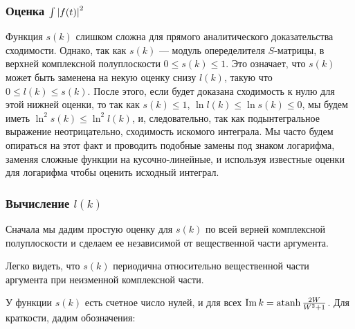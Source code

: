 



\subsubsection{Оценка $\int \abs{f(t)}^2$}
Функция $s(k)$  слишком сложна для прямого аналитического доказательства сходимости. Однако, так как $s(k)$ — модуль опеределителя $S$-матрицы, в верхней комплексной полуплоскости $0 \le s(k) \le 1$. Это означает, что $s(k)$ может быть заменена на некую оценку снизу $l(k)$, такую что $0 \le l(k) \le s(k)$. После этого, если будет доказана сходимость к нулю для этой нижней оценки, то так как $s(k) \le 1$, $\ln l(k) \le \ln s(k) \le 0$, мы будем иметь $\ln^2 s(k) \le \ln^2 l(k)$, и, следовательно, так как подынтегральное выражение неотрицательно, сходимость искомого интеграла. Мы часто будем опираться на этот факт и проводить подобные замены под знаком логарифма, заменяя сложные функции на кусочно-линейные, и используя известные оценки для логарифма чтобы оценить исходный интеграл.

\subsubsection{Вычисление $l(k)$}
Сначала мы дадим простую оценку для $s(k)$ по всей верней комплексной полуплоскости и сделаем ее независимой от вещественной части аргумента.

Легко видеть, что $s(k)$ периодична относительно вещественной части аргумента при неизменной комплексной части.

У функции $s(k)$ есть счетное число нулей, и для всех $\operatorname{Im} k = \operatorname{atanh} \frac{2 W}{W^2 + 1}$. Для краткости, дадим обозначения:

